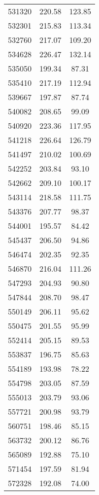 \documentclass[main.tex]{subfiles}
\begin{document}
\begin{longtable}{ccc}
		531320     & 220.58       & 123.85       \\
		532301     & 215.83       & 113.34       \\
		532760     & 217.07       & 109.20       \\
		534628     & 226.47       & 132.14       \\
		535050     & 199.34       & 87.31        \\
		535410     & 217.19       & 112.94       \\
		539667     & 197.87       & 87.74        \\
		540082     & 208.65       & 99.09        \\
		540920     & 223.36       & 117.95       \\
		541218     & 226.64       & 126.79       \\
		541497     & 210.02       & 100.69       \\
		542252     & 203.84       & 93.10        \\
		542662     & 209.10       & 100.17       \\
		543114     & 218.58       & 111.75       \\
		543376     & 207.77       & 98.37        \\
		544001     & 195.57       & 84.42        \\
		545437     & 206.50       & 94.86        \\
		546474     & 202.35       & 92.35        \\
		546870     & 216.04       & 111.26       \\
		547293     & 204.93       & 90.80        \\
		547844     & 208.70       & 98.47        \\
		550149     & 206.11       & 95.62        \\
		550475     & 201.55       & 95.99        \\
		552414     & 205.15       & 89.53        \\
		553837     & 196.75       & 85.63        \\
		554189     & 193.98       & 78.22        \\
		554798     & 203.05       & 87.59        \\
		555013     & 203.79       & 93.06        \\
		557721     & 200.98       & 93.79        \\
		560751     & 198.46       & 85.15        \\
		563732     & 200.12       & 86.76        \\
		565089     & 192.88       & 75.10        \\
		571454     & 197.59       & 81.94        \\
		572328     & 192.08       & 74.00       
	\end{longtable}
\end{document}
